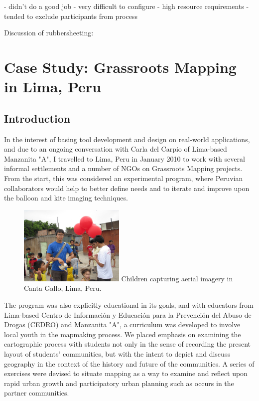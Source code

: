 \documentclass[11pt]{report}
\begin{document}
- didn't do a good job
- very difficult to configure
- high resource requirements
- tended to exclude participants from process

Discussion of rubbersheeting:
\cite{white1985piecewise}

\chapter{Case Study: Grassroots Mapping in Lima, Peru}
\label{chap:peru}

\section{Introduction}

In the interest of basing tool development and design on real-world applications, and due to an ongoing conversation with Carla del Carpio of Lima-based Manzanita "A", I travelled to Lima, Peru in January 2010 to work with several informal settlements and a number of NGOs on Grassroots Mapping projects. From the start, this was considered an experimental program, where Peruvian collaborators would help to better define needs and to iterate and improve upon the balloon and kite imaging techniques.

\begin{figure}
	\begin{flushright}
		\includegraphics[width=0.45\textwidth]{images/kids-canta-gallo.jpg}
		Children capturing aerial imagery in Canta Gallo, Lima, Peru.
	\end{flushright}
\end{figure}

The program was also explicitly educational in its goals, and with educators from Lima-based Centro de Información y Educación para la Prevención del Abuso de Drogas (CEDRO) and Manzanita "A", a curriculum was developed to involve local youth in the mapmaking process. We placed emphasis on examining the cartographic process with students not only in the sense of recording the present layout of students' communities, but with the intent to depict and discuss geography in the context of the history and future of the communities. A series of exercises were devised to situate mapping as a way to examine and reflect upon rapid urban growth and participatory urban planning such as occurs in the partner communities.
\end{document}
